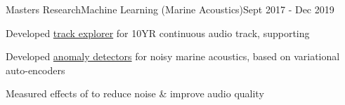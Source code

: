 \documentclass{article}
\newenvironment{**mylist}[2]{

\subsubsection*{#1\hfill#2}
  \small
  \begin{list}{}{}
    \setlength{\topsep}{.2pt}
   \setlength{\itemsep}{.8pt}
   \setlength{\parskip}{0pt}
   \setlength{\parsep}{0pt}}{\end{list}\normalsize}
\newcommand{\LU}[1]{\hspace{-1em}{\bf Technologies : #1}}
\begin{document}
\begin{**mylist}{ Masters Research\tabb Machine Learning (Marine Acoustics)}{Sept 2017 - Dec 2019}
\item Developed \href{https://github.com/probinso/ACOio}{track explorer} for 10YR continuous audio track, supporting  %
\item Developed \href{https://github.com/probinso/gumiho-network}{anomaly detectors} for noisy marine acoustics, based on variational auto-encoders
\item Measured effects of  to reduce noise \& improve audio quality
\end{**mylist}
\end{document}
